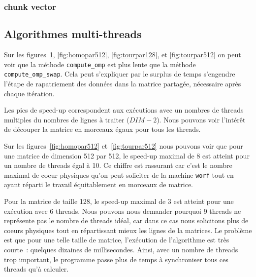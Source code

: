 \subsubsection{chunk vector}

\subsection{Algorithmes multi-threads}

Sur les figures~\ref{fig:homopar128}, \ref{fig:homopar512},
\ref{fig:tourpar128}, et \ref{fig:tourpar512} on peut voir que la
méthode \texttt{compute\_omp} est plus lente que la méthode
\texttt{compute\_omp\_swap}. Cela peut s'expliquer par le surplus de
temps s'engendre l'étape de rapatriement des données dans la matrice
partagée, nécessaire après chaque itération.
\medskip

Les pics de speed-up correspondent aux exécutions avec un nombres de
threads multiples du nombres de lignes à traiter ($DIM-2$). Nous
pouvons voir l'intérêt de découper la matrice en morceaux égaux pour
tous les threads.
\medskip

Sur les figures~\ref{fig:homopar512} et~\ref{fig:tourpar512} nous
pouvons voir que pour une matrice de dimension 512 par 512, le speed-up
maximal de 8 est atteint pour un nombre de threads égal à 10. Ce
chiffre est rassurant car c'est le nombre maximal de coeur physiques qu'on peut
soliciter de la machine \texttt{worf} tout en ayant réparti le travail
équitablement en morceaux de matrice.
\medskip

Pour la matrice de taille 128, le speed-up maximal de 3 est atteint
pour une exécution avec 6 threads. Nous pouvons nous demander pourquoi
9 threads ne représente pas le nombre de threads idéal, car dans ce
cas nous solicitons plus de coeurs physiques tout en répartissant
mieux les lignes de la matrices. Le problème est que pour une telle
taille de matrice, l'exécution de l'algorithme est très courte~:
quelques dizaines de millisecondes. Ainsi, avec un nombre de threads
trop important, le programme passe plus de temps à synchroniser tous
ces threads qu'à calculer.
\medskip

\begin{figure}[!ht]
  \caption{}
  \label{fig:homopar128}
\end{figure}

